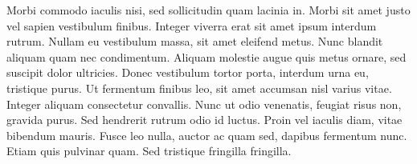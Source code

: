 \documentclass{tufte-handout}
\begin{document}
Morbi commodo iaculis nisi, sed sollicitudin quam lacinia in. Morbi sit
amet justo vel sapien vestibulum finibus. Integer viverra erat sit amet
ipsum interdum rutrum. Nullam eu vestibulum massa, sit amet eleifend
metus. Nunc blandit aliquam quam nec condimentum. Aliquam molestie augue
quis metus ornare, sed suscipit dolor ultricies. Donec vestibulum tortor
porta, interdum urna eu, tristique purus. Ut fermentum finibus leo, sit
amet accumsan nisl varius vitae. Integer aliquam consectetur convallis.
Nunc ut odio venenatis, feugiat risus non, gravida purus. Sed hendrerit
rutrum odio id luctus. Proin vel iaculis diam, vitae bibendum mauris.
Fusce leo nulla, auctor ac quam sed, dapibus fermentum nunc. Etiam quis
pulvinar quam. Sed tristique fringilla fringilla.
\end{document}

